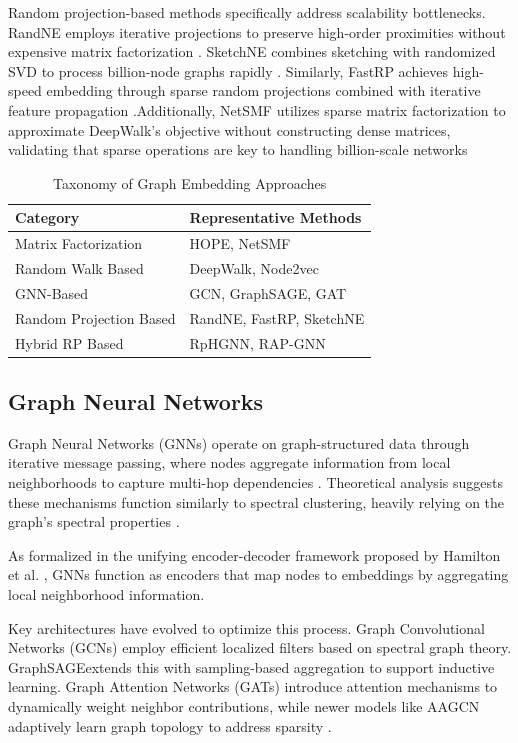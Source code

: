 \documentclass[conference]{IEEEtran}
\begin{document}
Random projection-based methods specifically address scalability bottlenecks. RandNE employs iterative projections to preserve high-order proximities without expensive matrix factorization \cite{zhang2018randne}. SketchNE combines sketching with randomized SVD to process billion-node graphs rapidly \cite{xie2023sketchne}. Similarly, FastRP achieves high-speed embedding through sparse random projections combined with iterative feature propagation \cite{chen2019fast}.Additionally, NetSMF utilizes sparse matrix factorization to approximate DeepWalk's objective without constructing dense matrices, validating that sparse operations are key to handling billion-scale networks \cite{qiu2019netsmf}
\begin{table}[ht]
\centering
\caption{Taxonomy of Graph Embedding Approaches}
\label{tab:taxonomy}
\begin{tabular}{ll}
\toprule
\textbf{Category} & \textbf{Representative Methods} \\
\midrule
Matrix Factorization & HOPE, NetSMF \\
Random Walk Based & DeepWalk, Node2vec \\
GNN-Based & GCN, GraphSAGE, GAT \\
Random Projection Based & RandNE, FastRP, SketchNE \\
Hybrid RP Based & RpHGNN, RAP-GNN \\
\bottomrule
\end{tabular}
\end{table}


\subsection{Graph Neural Networks}

Graph Neural Networks (GNNs) operate on graph-structured data through iterative message passing, where nodes aggregate information from local neighborhoods to capture multi-hop dependencies \cite{gkarmpounis2024, khemani2024}. Theoretical analysis suggests these mechanisms function similarly to spectral clustering, heavily relying on the graph's spectral properties \cite{li2021message}.

As formalized in the unifying encoder-decoder framework proposed by Hamilton et al. \cite{hamilton2017representation}, GNNs function as encoders that map nodes to embeddings by aggregating local neighborhood information.

Key architectures have evolved to optimize this process. Graph Convolutional Networks (GCNs) employ efficient localized filters based on spectral graph theory. GraphSAGE\cite{khemani2024}extends this with sampling-based aggregation to support inductive learning. Graph Attention Networks (GATs) introduce attention mechanisms to dynamically weight neighbor contributions, while newer models like AAGCN adaptively learn graph topology to address sparsity \cite{wang2021aagcn}.
\end{document}
